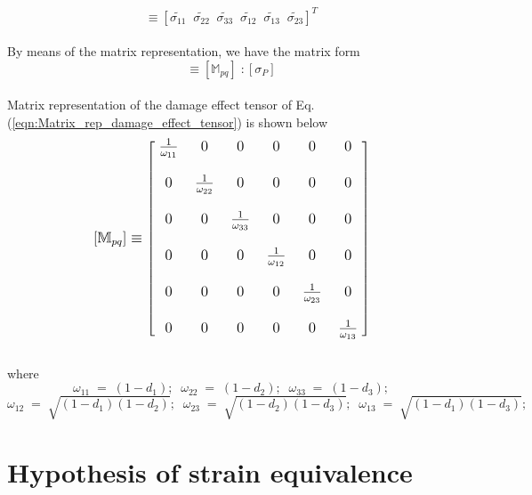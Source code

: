 \documentclass[12pt,a4paper,twoside,openright]{report}
\begin{document}
\begin{equation}
   [\tilde{\sigma_{P}}]  \equiv  [\tilde{\sigma_{11}} \;\; \tilde{\sigma_{22}} \;\;\tilde{\sigma_{33}} \;\;\tilde{\sigma_{12}} \;\;\tilde{\sigma_{13}} \;\;\tilde{\sigma_{23}} ]^{T}
\end{equation}
\\
By means of the matrix representation, we have the matrix form
\begin{equation}
[\tilde{\sigma_{P}}] \equiv [\mathbb{M}_{pq}]\;: [\sigma_{P}]
\label{eqn:Matrix_rep_damage_effect_tensor}
\end{equation}
\\
Matrix representation of the damage effect tensor of Eq.(\ref{eqn:Matrix_rep_damage_effect_tensor}) is shown below \citep{wang2009three}
\\
$$
\mathlarger{ [\mathbb{M}_{pq}] \equiv   
 \begin{bmatrix}
   \; \frac{1}{\omega_{11}}  \; & 0 \; & 0 \; & 0 \; & 0\; & 0  \;\\
  \\
   \;0\; & \frac{1}{\omega_{22}}\; & 0\; & 0\; & 0\; & 0  \;\\
  \\
  \; 0\; & 0 \; & \frac{1}{\omega_{33}}\; & 0\; & 0\; & 0 \; \\
  \\
   \; 0\; & 0\; & 0\; & \frac{1}{\omega_{12}}\; & 0\; & 0  \;\\
  \\
   \; 0\; & 0\; & 0\; & 0\; & \frac{1}{\omega_{23}}\; & 0  \;\\
  \\
   \; 0\; & 0\; & 0\; & 0\; & 0\; & \frac{1}{\omega_{13}}  \; 
  \\
 \end{bmatrix}}
 \label{Damage_effect_tensor}
 $$
\\
where
$$\omega_{11} \; = \; (1 - d_{1}); \;\;  \omega_{22} \; = \; (1 - d_{2}); \;\; \omega_{33} \; = \; (1 - d_{3});$$ \vspace*{0.1cm} $$\omega_{12} \; = \; \sqrt{(1 - d_{1})(1 - d_{2})};  \;\;\omega_{23} \; = \; \sqrt{(1 - d_{2})(1 - d_{3})}; \;\; \omega_{13} \; = \; \sqrt{(1 - d_{1})(1 - d_{3})};$$

\section{Hypothesis of strain equivalence}\label{Hypothesis of Strain Equivalence}
\end{document}
